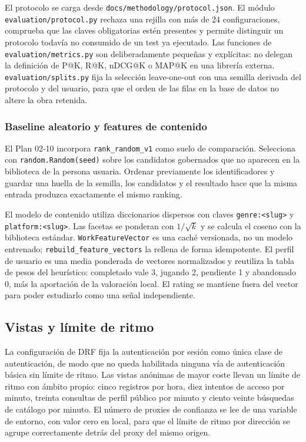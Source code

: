 El protocolo se carga desde \texttt{docs/methodology/protocol.json}. El módulo
\texttt{evaluation/protocol.py} rechaza una rejilla con más de 24 configuraciones, comprueba
que las claves obligatorias estén presentes y permite distinguir un protocolo todavía no
consumido de un test ya ejecutado. Las funciones de \texttt{evaluation/metrics.py} son
deliberadamente pequeñas y explícitas: no delegan la definición de P@K, R@K, nDCG@K o MAP@K
en una librería externa. \texttt{evaluation/splits.py} fija la selección leave-one-out con
una semilla derivada del protocolo y del usuario, para que el orden de las filas en la base
de datos no altere la obra retenida.

\subsubsection{Baseline aleatorio y features de contenido}

El Plan 02-10 incorpora \texttt{rank\_random\_v1} como suelo de comparación. Selecciona con
\texttt{random.Random(seed)} sobre los candidatos gobernados que no aparecen en la biblioteca
de la persona usuaria. Ordenar previamente los identificadores y guardar una huella de la
semilla, los candidatos y el resultado hace que la misma entrada produzca exactamente el
mismo ranking.

El modelo de contenido utiliza diccionarios dispersos con claves \texttt{genre:<slug>} y
\texttt{platform:<slug>}. Las facetas se ponderan con $1/\sqrt{k}$ y se calcula el coseno
con la biblioteca estándar. \texttt{WorkFeatureVector} es una caché versionada, no un modelo
entrenado; \texttt{rebuild\_feature\_vectors} la rellena de forma idempotente. El perfil
de usuario es una media ponderada de vectores normalizados y reutiliza la tabla de pesos del
heurístico: completado vale 3, jugando 2, pendiente 1 y abandonado 0, más la aportación de
la valoración local. El rating se mantiene fuera del vector para poder estudiarlo como una
señal independiente.

\subsection{Vistas y límite de ritmo}\label{sec:impl-vistas}

La configuración de DRF fija la autenticación por sesión como única clase de autenticación,
de modo que no queda habilitada ninguna vía de autenticación básica sin límite de ritmo. Las
vistas anónimas de mayor coste llevan un límite de ritmo con ámbito propio: cinco registros
por hora, diez intentos de acceso por minuto, treinta consultas de perfil público por minuto
y ciento veinte búsquedas de catálogo por minuto. El número de proxies de confianza se lee de
una variable de entorno, con valor cero en local, para que el límite de ritmo por dirección
se agrupe correctamente detrás del proxy del mismo origen.

